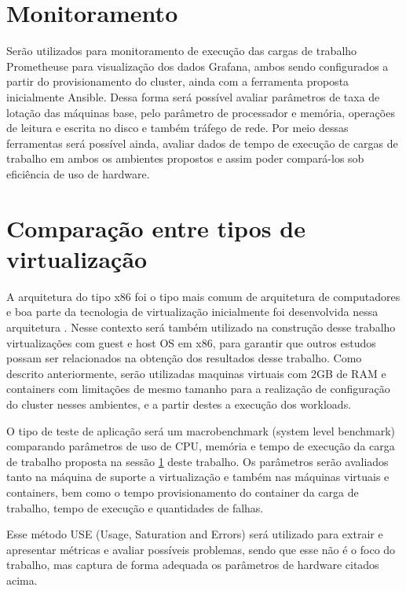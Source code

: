 \section{Monitoramento}
\label{cap:monitor}

Serão utilizados para monitoramento de execução das cargas de trabalho Prometheus\textregistered  e para visualização dos dados Grafana\textregistered, ambos sendo configurados a partir do provisionamento do cluster, ainda com a ferramenta proposta inicialmente Ansible\textregistered. Dessa forma será possível avaliar parâmetros de taxa de lotação das máquinas base, pelo parâmetro de processador e memória, operações de leitura e escrita no disco e também tráfego de rede. Por meio dessas ferramentas será possível ainda, avaliar dados de tempo de execução de cargas de trabalho em ambos os ambientes propostos e assim poder compará-los sob eficiência de uso de hardware.

\section{Comparação entre tipos de virtualização}

A arquitetura do tipo x86 foi o tipo mais comum de arquitetura de computadores e boa parte da tecnologia de virtualização inicialmente foi desenvolvida nessa arquitetura \cite{fayyad_benchmarking_2013}. Nesse contexto será também utilizado na construção desse trabalho virtualizações com guest e host OS  em x86, para garantir que outros estudos possam ser relacionados na obtenção dos resultados desse trabalho.
Como descrito anteriormente, serão utilizadas maquinas virtuais com 2GB de RAM e containers com limitações de mesmo tamanho para a realização de configuração do cluster nesses ambientes, e a partir destes a execução dos workloads.

O tipo de teste de aplicação será um macrobenchmark (system level benchmark) \cite{huge2008,scheepers2014virtualization} comparando parâmetros de uso de CPU, memória e tempo de execução da carga de trabalho proposta na sessão \ref{cap:monitor} deste trabalho. Os parâmetros serão avaliados  tanto na máquina de suporte a virtualização e também nas máquinas virtuais e containers, bem como o tempo provisionamento do container da carga de trabalho, tempo de execução e quantidades de falhas.

Esse método USE (Usage, Saturation and Errors) \cite{greg2022} será utilizado para extrair e apresentar métricas e avaliar possíveis problemas, sendo que esse não é o foco do trabalho, mas captura de forma adequada os parâmetros de hardware citados acima.


